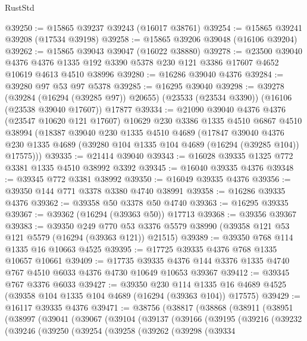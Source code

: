 \begin{lexlean}{RustStd}
\begin{coremodule}
@39250 := @15865 @39237 @39243 (@16017 @38761)
@39254 := @15865 @39241 @39208 (@17534 @39198)
@39258 := @15865 @39206 @39048 (@16106 @39204)
@39262 := @15865 @39043 @39047 (@16022 @38880)
@39278 := @23500
    @39040
    @4376
    @4376
    @1335
    @192
    @3390
    @5378
    @230
    @121
    @3386
    @17607
    @4652
    @10619
    @4613
    @4510
    @38996
@39280 := @16286 @39040 @4376
@39284 := @39280 @97 @53 @97 @5378
@39285 := @16295 @39040
@39298 := @39278
    (@39284 (@16294 (@39285 @97)) @20655)
    (@23533 (@23534 @3390))
    (@16106 (@23538 @39040 @17607))
    @17877
@39334 := @21090
    @39040
    @4376
    @4376
    (@23547 @10620 @121 @17607)
    @10629
    @230
    @3386
    @1335
    @4510
    @6867
    @4510
    @38994
    (@18387
      @39040
      @230
      @1335
      @4510
      @4689
      (@17847
        @39040
        @4376
        @230
        @1335
        @4689
        (@39280 @104 @1335 @104 @4689 (@16294 (@39285 @104)) @17575)))
@39335 := @21414 @39040
@39343 := @16028 @39335 @1325 @772 @3381 @1335 @4510 @38992 @3392
@39345 := @16040 @39335 @4376
@39348 := @39345 @772 @3381 @38992
@39350 := @16049 @39335 @4376
@39356 := @39350 @144 @771 @3378 @3380 @4740 @38991
@39358 := @16286 @39335 @4376
@39362 := @39358 @50 @3378 @50 @4740
@39363 := @16295 @39335
@39367 := @39362 (@16294 (@39363 @50)) @17713
@39368 := @39356 @39367
@39383 := @39350
    @249
    @770
    @53
    @3376
    @5579
    @38990
    (@39358 @121 @53 @121 @5579 (@16294 (@39363 @121)) @21515)
@39389 := @39350 @768 @114 @1335 @16 @10663 @4525
@39395 := @17725 @39335 @4376 @768 @1335 @10657 @10661
@39409 := @17735
    @39335
    @4376
    @144
    @3376
    @1335
    @4740
    @767
    @4510
    @6033
    @4376
    @4730
    @10649
    @10653
    @39367
@39412 := @39345 @767 @3376 @6033
@39427 := @39350
    @230
    @114
    @1335
    @16
    @4689
    @4525
    (@39358 @104 @1335 @104 @4689 (@16294 (@39363 @104)) @17575)
@39429 := @16117 @39335 @4376
@39471 := @38756
    (@38817
      (@38868
        (@38911
          (@38951
            (@38997
              (@39041
                (@39067
                  (@39104
                    (@39137
                      (@39166
                        (@39195
                          (@39216
                            (@39232
                              (@39246
                                (@39250
                                  (@39254
                                    (@39258
                                      (@39262
                                        (@39298
                                          (@39334

\end{coremodule}
\end{lexlean}
